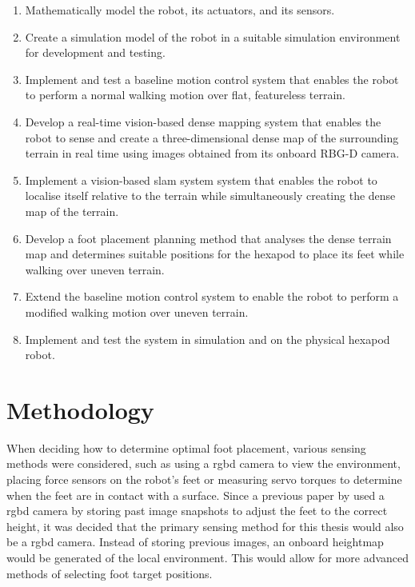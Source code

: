     \begin{enumerate}
        \item Mathematically model the robot, its actuators, and its sensors.
        \item Create a simulation model of the robot in a suitable simulation environment for development and testing.
        \item Implement and test a baseline motion control system that enables the robot to
        perform a normal walking motion over flat, featureless terrain.
        \item Develop a real-time vision-based dense mapping system that enables the robot to sense and create a three-dimensional 
        dense map of the surrounding terrain in real time using images obtained from its onboard RBG-D camera.
        \item Implement a vision-based \ac{slam} system system that enables the robot to localise itself relative to the terrain
        while simultaneously creating the dense map of the terrain.
        \item Develop a foot placement planning method that analyses the dense terrain map and determines suitable positions
        for the hexapod to place its feet while walking over uneven terrain.
        \item Extend the baseline motion control system to enable the robot to perform a modified walking motion over uneven terrain.
        \item Implement and test the system in simulation and on the physical hexapod robot.
    \end{enumerate}


\section{Methodology}
    When deciding how to determine optimal foot placement, various sensing methods were considered, such as using a \ac{rgbd} camera to view the environment, placing force sensors on the robot's feet or measuring servo torques to determine when the feet are in contact with a surface. Since a previous paper by \cite{erasmus2023guidance} used a \ac{rgbd} camera by storing past image snapshots to adjust the feet to the correct height, it was decided that the primary sensing method for this thesis would also be a \ac{rgbd} camera. Instead of storing previous images, an onboard heightmap would be generated of the local environment. This would allow for more advanced methods of selecting foot target positions.


